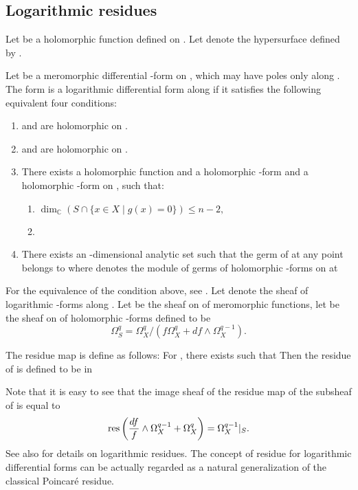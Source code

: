 \documentclass{arxsigma}
\begin{document}
\subsection{Logarithmic residues}
Let   be a holomorphic function defined on  . Let   denote the hypersurface
defined by  .
\begin{definition}
Let   be a meromorphic differential  -form on  , which may have poles only along  . The form   is a logarithmic differential form along   if it satisfies the following equivalent four conditions:
\begin{enumerate}
\item   and   are holomorphic on  .
\item   and   are holomorphic on  .
\item There exists a holomorphic function   and a holomorphic  -form  
and a holomorphic  -form   on  ,
such that:
\begin{enumerate}
\item $ \dim_{\mathbb C}( S \cap \{x
\in X \mid g(x)=0 \}) \leq n-2, $
\item  
\end{enumerate}
\item There exists an  -dimensional analytic set   such that the germ of   at any point   belongs to   where   denotes the module of germs of holomorphic  -forms on   at  
\end{enumerate}
\end{definition}
For the equivalence of the condition above, see \cite{S}.
Let   denote the sheaf of logarithmic  -forms along  .
Let   be the sheaf on   of meromorphic functions, let   be the sheaf on   of holomorphic  -forms defined to be
\begin{equation*}
\Omega_{S}^{q} = \Omega_{X}^{q}/(f\Omega_X^{q} + df \wedge \Omega_{X}^{q-1}).
\end{equation*}
\begin{definition}
The residue map   is define as follows:
For  , there exists   such that
  Then
the residue of   is defined to be
  in  
\end{definition}
Note that it is easy to see that the image sheaf of the residue map   of the subsheaf   of   is equal to  
\begin{equation*}{\rm res}\left( \frac{df}{f}\wedge \Omega_X^{q-1} + \Omega_X^{q}\right) = \Omega_X^{q-1}|_S.
\end{equation*}
See also \cite{S} for details on logarithmic residues.
The concept of residue for logarithmic differential forms can be actually regarded as a natural generalization of the classical Poincar\'e residue.
\end{document}
